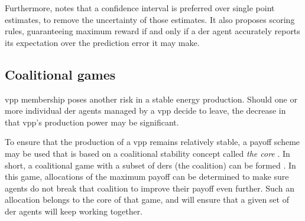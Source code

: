Furthermore, \cite{RobuKotaChalkiadakisEtAl2012} notes that a confidence interval is preferred over single point estimates, to remove the uncertainty of those estimates. It also proposes scoring rules, guaranteeing maximum reward if and only if a \ac{der} agent accurately reports its expectation over the prediction error it may make.  

\subsection{Coalitional games}
\label{vpp:coalition}
\ac{vpp} membership poses another risk in a stable energy production. Should one or more individual \ac{der} agents managed by a \ac{vpp} decide to leave, the decrease in that \ac{vpp}'s production power may be significant. 

To ensure that the production of a \ac{vpp} remains relatively stable, a payoff scheme may be used that is based on a coalitional stability concept called \emph{the core} \cite{Myerson1991}. In short, a coalitional game with a subset of \acp{der} (the coalition) can be formed \cite{MihailescuVasiraniOssowski2011}. In this game, allocations of the maximum payoff can be determined to make sure agents do not break that coalition to improve their payoff even further\cite{ChalkiadakisRobuKotaEtAl2011, YeungPoonWu1999, SaadHanPoor2011}. Such an allocation belongs to the core of that game, and will ensure that a given set of \ac{der} agents will keep working together.



